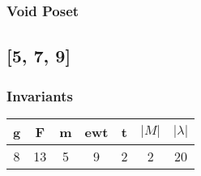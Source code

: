 \documentclass[a4paper]{article}
\begin{document}
\hfill\begin{minipage}{0.48\textwidth}
\subsubsection*{Void Poset}
\centering
{}
\end{minipage}
\newpage\subsection{[5, 7, 9]}
\noindent\begin{minipage}{0.6\textwidth}
\subsubsection*{Invariants}
\centering
\begin{tabular}{|c|c|c|c|c|c|c|}
\toprule
g & F & m & ewt & t & \(|M|\) & \(|\lambda|\) \\
\midrule
8 & 13 & 5 & 9 & 2 & 2 & 20 \\
\bottomrule
\end{tabular}
\end{minipage}%
\end{document}
